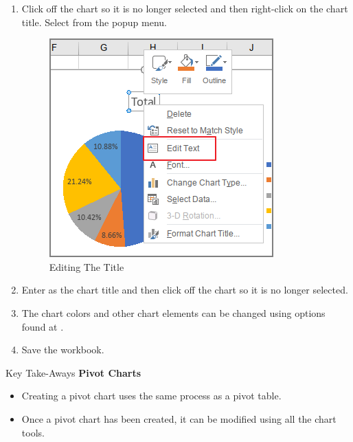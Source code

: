 \begin{enumbox}
\begin{enumerate}
		\item Click off the chart so it is no longer selected and then right-click on the chart title. Select  from the popup menu.

		\begin{figure}[H]
			\centering
			\includegraphics[width=\maxwidth{.75\linewidth}]{gfx/ch07_fig32}
			\caption{Editing The Title}
			\label{07:fig32}
		\end{figure}

		\item Enter  as the chart title and then click off the chart so it is no longer selected.
		\item The chart colors and other chart elements can be changed using options found at .
		\item Save the  workbook.
	\end{enumerate}
\end{enumbox}

\begin{center}
	\begin{tkwbox}{Key Take-Aways}
		\textbf{Pivot Charts}
		\\
		\begin{itemize}
			\setlength{\itemsep}{0pt}
			\setlength{\parskip}{0pt}
			\setlength{\parsep}{0pt}
			
			\item Creating a pivot chart uses the same process as a pivot table.
			\item Once a pivot chart has been created, it can be modified using all the chart tools.
			
		\end{itemize}
	\end{tkwbox}
\end{center}


